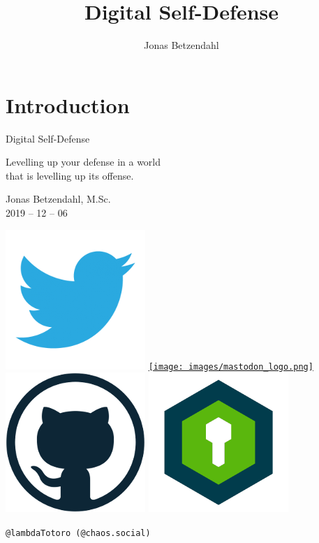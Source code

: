 \documentclass[aspectratio=169,dvipsnames]{beamer}
\author{Jonas Betzendahl}
\title{Digital Self-Defense}
\begin{document}
\section{Introduction}

\begin{frame}
\begin{center}
\vfill
\huge Digital Self-Defense
\normalsize 
\smallskip
\smallskip

Levelling up your defense in a world\\ that is levelling up its offense.
\bigskip\bigskip

\large Jonas Betzendahl, M.Sc.\\
2019 -- 12 -- 06
\bigskip\bigskip

\href{https://twitter.com/lambdatotoro}{\includegraphics[scale=0.125]{images/twitter_logo.png}}
\href{https://chaos.social/@lambdatotoro}{\texttt{[image: images/mastodon\_logo.png]}}
\href{https://github.com/lambdaTotoro}{\includegraphics[scale=0.125]{images/github_logo.png}}
\href{https://whispeer.de/en/user/jbetzend}{\includegraphics[scale=0.125]{images/whispeer_logo.png}}

\texttt{@lambdaTotoro (@chaos.social)}
\end{center}
\end{frame}
\end{document}
